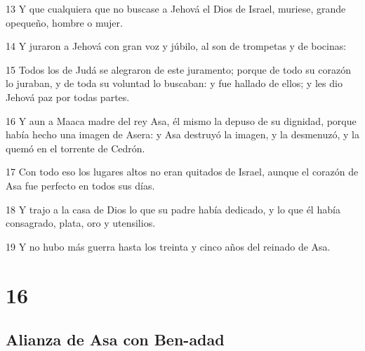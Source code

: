 \par 13 Y que cualquiera que no buscase a Jehová el Dios de Israel, muriese, grande opequeño, hombre o mujer.
\par 14 Y juraron a Jehová con gran voz y júbilo, al son de trompetas y de bocinas:
\par 15 Todos los de Judá se alegraron de este juramento; porque de todo su corazón lo juraban, y de toda su voluntad lo buscaban: y fue hallado de ellos; y les dio Jehová paz por todas partes.
\par 16 Y aun a Maaca madre del rey Asa, él mismo la depuso de su dignidad, porque había hecho una imagen de Asera: y Asa destruyó la imagen, y la desmenuzó, y la quemó en el torrente de Cedrón.
\par 17 Con todo eso los lugares altos no eran quitados de Israel, aunque el corazón de Asa fue perfecto en todos sus días.
\par 18 Y trajo a la casa de Dios lo que su padre había dedicado, y lo que él había consagrado, plata, oro y utensilios.
\par 19 Y no hubo más guerra hasta los treinta y cinco años del reinado de Asa.

\chapter{16}

\section*{Alianza de Asa con Ben-adad}

